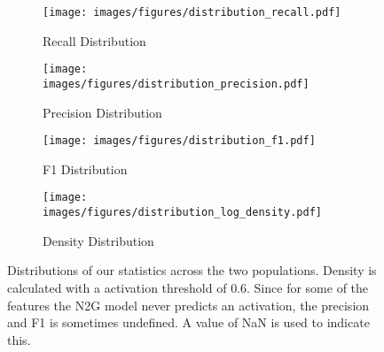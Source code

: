 \begin{figure}[ht]
    \centering
    
    \begin{subfigure}[b]{0.45\textwidth}
        \centering
        \texttt{[image: images/figures/distribution\_recall.pdf]}
        \caption{Recall Distribution}
        \label{fig:distributions_recall}
    \end{subfigure}
    \begin{subfigure}[b]{0.45\textwidth}
        \centering
        \texttt{[image: images/figures/distribution\_precision.pdf]}
        \caption{Precision Distribution}
        \label{fig:distributions_precision}
    \end{subfigure}
    
    \begin{subfigure}[b]{0.45\textwidth}
        \centering
        \texttt{[image: images/figures/distribution\_f1.pdf]}
        \caption{F1 Distribution}
        \label{fig:distributions_f1}
    \end{subfigure}
    \begin{subfigure}[b]{0.45\textwidth}
        \centering
        \texttt{[image: images/figures/distribution\_log\_density.pdf]}
        \caption{Density Distribution}
        \label{fig:distributions_log_density}
    \end{subfigure}
    
    \caption{Distributions of our statistics across the two populations. 
    Density is calculated with a activation threshold of $0.6$. Since for some of the features the \ac{N2G} model never predicts an activation, the precision and F1 is sometimes undefined. A value of NaN is used to indicate this.}
    \label{fig:distributions}
\end{figure}

